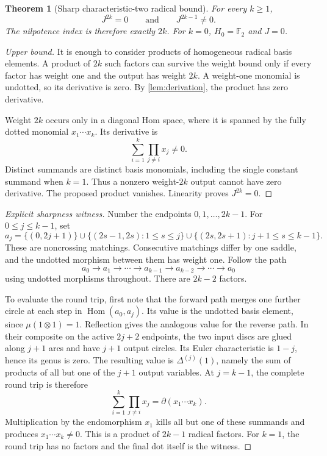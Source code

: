 \documentclass[11pt,letterpaper]{article}
\newtheorem{theorem}{Theorem}[section]
\theoremstyle{definition}
\theoremstyle{remark}
\newcommand{\F}{\mathbb F_2}
\newcommand{\Hom}{\operatorname{Hom}}
\begin{document}
\begin{theorem}[Sharp characteristic-two radical bound]\label{thm:nilpotence}
For every $k\geq1$,
\begin{equation}\label{eq:sharpnil}
 J^{2k}=0\qquad\text{and}\qquad J^{2k-1}\ne0.
\end{equation}
The nilpotence index is therefore exactly $2k$. For $k=0$, $H_0=\F$ and $J=0$.
\end{theorem}
\begin{proof}[Upper bound]
It is enough to consider products of homogeneous radical basis elements.
A product of $2k$ such factors can survive the weight bound only if every factor
has weight one and the output has weight $2k$. A weight-one monomial is
undotted, so its derivative is zero. By \cref{lem:derivation}, the product has
zero derivative.

Weight $2k$ occurs only in a diagonal Hom space, where it is spanned by the
fully dotted monomial $x_1\cdots x_k$. Its derivative is
\[
 \sum_{i=1}^k\prod_{j\ne i}x_j\ne0.
\]
Distinct summands are distinct basis monomials, including the single constant
summand when $k=1$. Thus a nonzero weight-$2k$ output cannot have zero
derivative. The proposed product vanishes. Linearity proves $J^{2k}=0$.
\end{proof}

\begin{proof}[Explicit sharpness witness]
Number the endpoints $0,1,\ldots,2k-1$. For $0\leq j\leq k-1$, set
\begin{equation}\label{eq:nested}
 a_j=\{(0,2j+1)\}\cup\{(2s-1,2s):1\leq s\leq j\}
       \cup\{(2s,2s+1):j+1\leq s\leq k-1\}.
\end{equation}
These are noncrossing matchings. Consecutive matchings differ by one saddle,
and the undotted morphism between them has weight one. Follow the path
\[
 a_0\longrightarrow a_1\longrightarrow\cdots\longrightarrow a_{k-1}
 \longrightarrow a_{k-2}\longrightarrow\cdots\longrightarrow a_0
\]
using undotted morphisms throughout. There are $2k-2$ factors.

To evaluate the round trip, first note that the forward path merges one further
circle at each step in $\Hom(a_0,a_j)$. Its value is the undotted basis element,
since $\mu(1\otimes1)=1$. Reflection gives the analogous value for the reverse
path. In their composite on the active $2j+2$ endpoints, the two input discs
are glued along $j+1$ arcs and have $j+1$ output circles. Its Euler
characteristic is $1-j$, hence its genus is zero. The resulting value is
$\Delta^{(j)}(1)$, namely the sum of products of all but one of the $j+1$
output variables. At $j=k-1$, the complete round trip is therefore
\begin{equation}\label{eq:roundtrip}
 \sum_{i=1}^k\prod_{j\ne i}x_j=\partial(x_1\cdots x_k).
\end{equation}
Multiplication by the endomorphism $x_1$ kills all but one of these summands and
produces $x_1\cdots x_k\ne0$. This is a product of $2k-1$ radical factors.
For $k=1$, the round trip has no factors and the final dot itself is the witness.
\end{proof}
\end{document}

